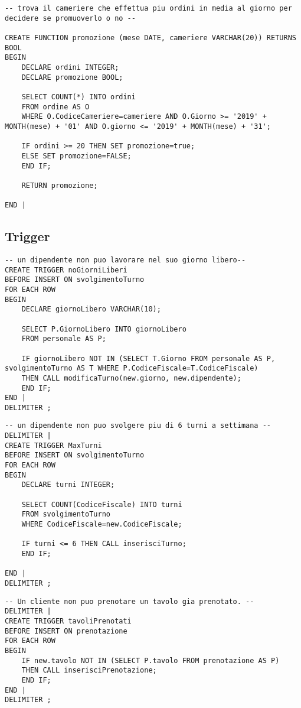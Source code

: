 \begin{lstlisting}[title=Operazione 14, style=mysqlStyle]
-- trova il cameriere che effettua piu ordini in media al giorno per decidere se promuoverlo o no --

CREATE FUNCTION promozione (mese DATE, cameriere VARCHAR(20)) RETURNS BOOL
BEGIN
    DECLARE ordini INTEGER;
    DECLARE promozione BOOL;
    
    SELECT COUNT(*) INTO ordini
    FROM ordine AS O
    WHERE O.CodiceCameriere=cameriere AND O.Giorno >= '2019' + MONTH(mese) + '01' AND O.giorno <= '2019' + MONTH(mese) + '31';
    
    IF ordini >= 20 THEN SET promozione=true;
    ELSE SET promozione=FALSE;
    END IF;
    
    RETURN promozione;
    
END |
\end{lstlisting}

\subsection{Trigger} %
\begin{lstlisting}[title=Regola di vincolo 1, style=mysqlStyle]
-- un dipendente non puo lavorare nel suo giorno libero--
CREATE TRIGGER noGiorniLiberi
BEFORE INSERT ON svolgimentoTurno
FOR EACH ROW
BEGIN
    DECLARE giornoLibero VARCHAR(10);
    
    SELECT P.GiornoLibero INTO giornoLibero
    FROM personale AS P;
    
    IF giornoLibero NOT IN (SELECT T.Giorno FROM personale AS P, svolgimentoTurno AS T WHERE P.CodiceFiscale=T.CodiceFiscale)
    THEN CALL modificaTurno(new.giorno, new.dipendente);
    END IF;
END |
DELIMITER ;
\end{lstlisting}

\begin{lstlisting}[title=Regola di vincolo 2, style=mysqlStyle]
-- un dipendente non puo svolgere piu di 6 turni a settimana --
DELIMITER |
CREATE TRIGGER MaxTurni
BEFORE INSERT ON svolgimentoTurno
FOR EACH ROW
BEGIN
    DECLARE turni INTEGER;
    
    SELECT COUNT(CodiceFiscale) INTO turni
    FROM svolgimentoTurno
    WHERE CodiceFiscale=new.CodiceFiscale;
    
    IF turni <= 6 THEN CALL inserisciTurno;
    END IF;
    
END |
DELIMITER ;
\end{lstlisting}

\begin{lstlisting}[title=Regola di vincolo 3, style=mysqlStyle]
-- Un cliente non puo prenotare un tavolo gia prenotato. --
DELIMITER |
CREATE TRIGGER tavoliPrenotati
BEFORE INSERT ON prenotazione
FOR EACH ROW
BEGIN
    IF new.tavolo NOT IN (SELECT P.tavolo FROM prenotazione AS P)
    THEN CALL inserisciPrenotazione;
    END IF;
END |
DELIMITER ;
\end{lstlisting}
